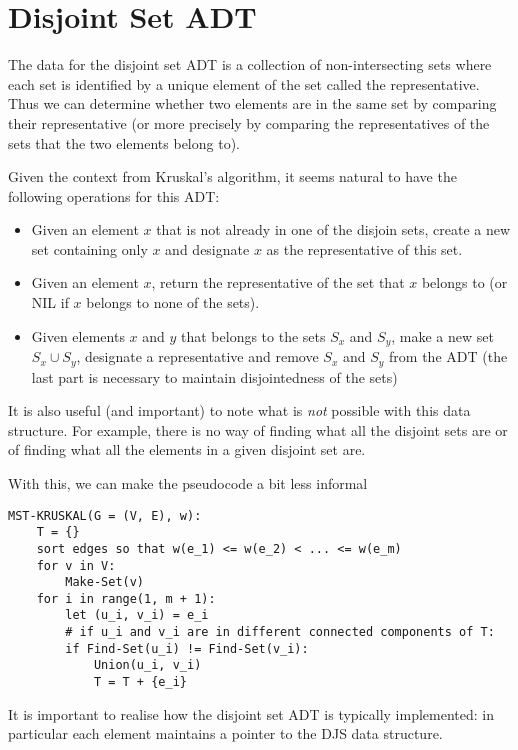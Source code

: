 \section{Disjoint Set ADT}
The data for the disjoint set ADT is a collection of non-intersecting sets where each set is identified by a unique element of the set called the representative. Thus we can determine whether two elements are in the same set by comparing their representative (or more precisely by comparing the representatives of the sets that the two elements belong to).

Given the context from Kruskal's algorithm, it seems natural to have the following operations for this ADT:
\begin{itemize}
    \item {} Given an element $x$ that is not already in one of the disjoin sets, create a new set containing only $x$ and designate $x$ as the representative of this set.
    \item {} Given an element $x$, return the representative of the set that $x$ belongs to (or NIL if $x$ belongs to none of the sets).
    \item {} Given elements $x$ and $y$ that belongs to the sets $S_x$ and $S_y$, make a new set $S_x \cup S_y$, designate a representative and remove $S_x$ and $S_y$ from the ADT (the last part is necessary to maintain disjointedness of the sets)
\end{itemize}
\begin{remark}
It is also useful (and important) to note what is \textit{not} possible with this data structure. For example, there is no way of finding what all the disjoint sets are or of finding what all the elements in a given disjoint set are.
\end{remark}
With this, we can make the pseudocode a bit less informal
\begin{lstlisting}
MST-KRUSKAL(G = (V, E), w):
    T = {}
    sort edges so that w(e_1) <= w(e_2) < ... <= w(e_m)
    for v in V:
        Make-Set(v)
    for i in range(1, m + 1):
        let (u_i, v_i) = e_i
        # if u_i and v_i are in different connected components of T:
        if Find-Set(u_i) != Find-Set(v_i):
            Union(u_i, v_i)
            T = T + {e_i}
\end{lstlisting}

It is important to realise how the disjoint set ADT is typically implemented: in particular each element maintains a pointer to the DJS data structure.

